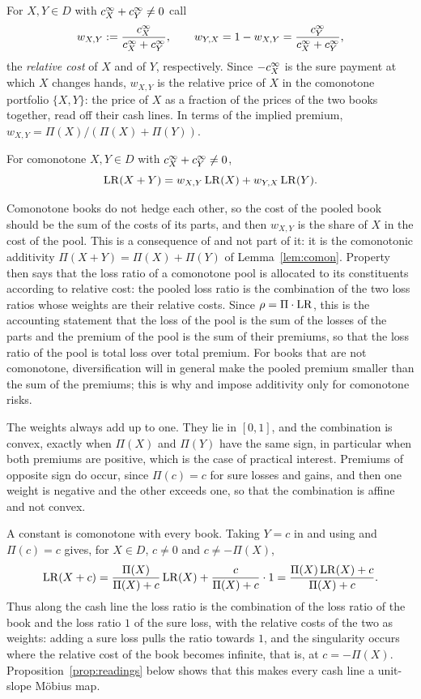 For $X,Y\in D$ with $c^{\infty}_{X}+c^{\infty}_{Y}\ne0$ call
\[
 w_{X,Y}:=\frac{c^{\infty}_{X}}{c^{\infty}_{X}+c^{\infty}_{Y}},\qquad w_{Y,X}=1-w_{X,Y}=\frac{c^{\infty}_{Y}}{c^{\infty}_{X}+c^{\infty}_{Y}},
\]
the \emph{relative cost} of $X$ and of $Y$, respectively. Since $-c^{\infty}_{X}$ is the sure payment at which $X$ changes
hands, $w_{X,Y}$ is the relative price of $X$ in the comonotone portfolio $\{X,Y\}$: the price of $X$ as a fraction
of the prices of the two books together, read off their cash lines. In terms of the implied premium,
$w_{X,Y}=\Pi(X)/(\Pi(X)+\Pi(Y))$.

\begin{property}[\axCM]\label{ax:CM}
For comonotone $X,Y\in D$ with $c^{\infty}_{X}+c^{\infty}_{Y}\neq0$,
\[
 \mathrm{LR}(X+Y)=w_{X,Y}\,\mathrm{LR}(X)+w_{Y,X}\,\mathrm{LR}(Y).
\]
\end{property}

Comonotone books do not hedge each other, so the cost of the pooled book should be the sum of the costs of its
parts, and then $w_{X,Y}$ is the share of $X$ in the cost of the pool. This is a consequence of \axCM{} and not
part of it: it is the comonotonic additivity $\Pi(X+Y)=\Pi(X)+\Pi(Y)$ of Lemma~\ref{lem:comon}. Property \axCM{} then
says that the loss ratio of a comonotone pool is allocated to its constituents according to relative cost: the pooled
loss ratio is the combination of the two loss ratios whose weights are their relative costs. Since
$\rho=\Pi\cdot\mathrm{LR}$, this is the accounting statement that the loss of the pool is the sum of the losses of the
parts and the premium of the pool is the sum of their premiums, so that the loss ratio of the pool is total loss over
total premium. For books that are not comonotone, diversification will in general make the pooled premium smaller than
the sum of the premiums; this is why \citet{yaari1987} and \citet{wyp1997} impose additivity only for comonotone risks.

The weights always add up to one. They lie in $[0,1]$, and the combination is convex, exactly when $\Pi(X)$ and
$\Pi(Y)$ have the same sign, in particular when both premiums are positive, which is the case of practical interest.
Premiums of opposite sign do occur, since $\Pi(c)=c$ for sure losses and gains, and then one weight is negative and the
other exceeds one, so that the combination is affine and not convex.

A constant is comonotone with every book. Taking $Y=c$ in \axCM{} and using \axN{} and $\Pi(c)=c$ gives, for
$X\in D$, $c\ne0$ and $c\ne-\Pi(X)$,
\begin{equation}\label{eq:pool}
 \mathrm{LR}(X+c)=\frac{\Pi(X)}{\Pi(X)+c}\,\mathrm{LR}(X)+\frac{c}{\Pi(X)+c}\cdot1
 =\frac{\Pi(X)\,\mathrm{LR}(X)+c}{\Pi(X)+c}.
\end{equation}
Thus along the cash line the loss ratio is the combination of the loss ratio of the book and the loss ratio $1$ of the
sure loss, with the relative costs of the two as weights: adding a sure loss pulls the ratio towards $1$, and the
singularity occurs where the relative cost of the book becomes infinite, that is, at $c=-\Pi(X)$.
Proposition~\ref{prop:readings} below shows that this makes every cash line a unit-slope Möbius map.

